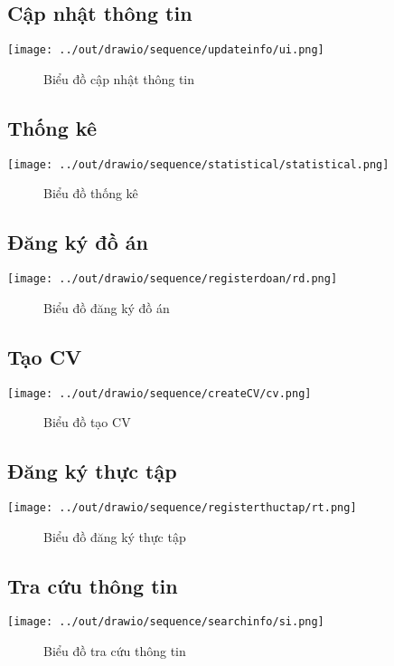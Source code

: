   \subsection{Cập nhật thông tin}
    \begin{center}
      \texttt{[image: ../out/drawio/sequence/updateinfo/ui.png]}
      \begin{figure}[h]
        \centering
        \caption{Biểu đồ cập nhật thông tin}
      \end{figure}
    \end{center}

  \subsection{Thống kê}
    \begin{center}
      \texttt{[image: ../out/drawio/sequence/statistical/statistical.png]}
      \begin{figure}[h]
        \centering
        \caption{Biểu đồ thống kê}
      \end{figure}
    \end{center}

  \subsection{Đăng ký đồ án}
    \begin{center}
      \texttt{[image: ../out/drawio/sequence/registerdoan/rd.png]}
      \begin{figure}[h]
        \centering
        \caption{Biểu đồ đăng ký đồ án}
      \end{figure}
    \end{center}

  \subsection{Tạo CV}
    \begin{center}
      \texttt{[image: ../out/drawio/sequence/createCV/cv.png]}
      \begin{figure}[h]
        \centering
        \caption{Biểu đồ tạo CV}
      \end{figure}
    \end{center}

  \subsection{Đăng ký thực tập}
    \begin{center}
      \texttt{[image: ../out/drawio/sequence/registerthuctap/rt.png]}
      \begin{figure}[h]
        \centering
        \caption{Biểu đồ đăng ký thực tập}
      \end{figure}
    \end{center}

  \subsection{Tra cứu thông tin}
    \begin{center}
      \texttt{[image: ../out/drawio/sequence/searchinfo/si.png]}
      \begin{figure}[h]
        \centering
        \caption{Biểu đồ tra cứu thông tin}
      \end{figure}
    \end{center}

